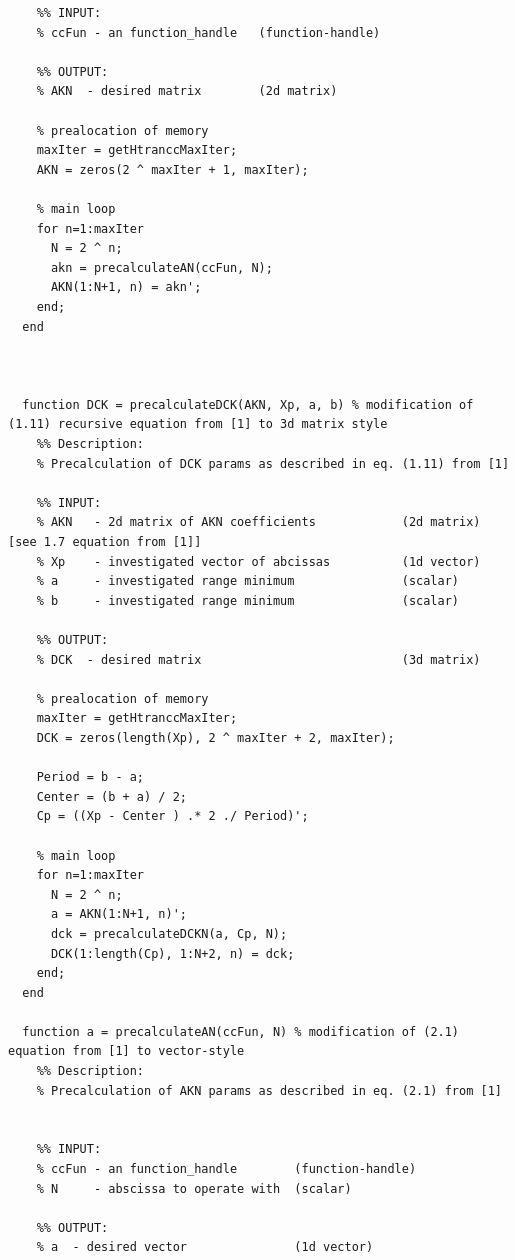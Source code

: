 \documentclass[12pt,twoside,a4paper]{article}
\numberwithin{equation}{subsection}
\numberwithin{figure}{subsection}
\begin{document}
\begin{lstlisting}
    %% INPUT:
    % ccFun - an function_handle   (function-handle) 

    %% OUTPUT:
    % AKN  - desired matrix        (2d matrix)

    % prealocation of memory
    maxIter = getHtranccMaxIter;
    AKN = zeros(2 ^ maxIter + 1, maxIter);

    % main loop
    for n=1:maxIter
      N = 2 ^ n;
      akn = precalculateAN(ccFun, N);
      AKN(1:N+1, n) = akn';
    end;
  end



  function DCK = precalculateDCK(AKN, Xp, a, b) % modification of (1.11) recursive equation from [1] to 3d matrix style
    %% Description:
    % Precalculation of DCK params as described in eq. (1.11) from [1] 

    %% INPUT:
    % AKN   - 2d matrix of AKN coefficients            (2d matrix) [see 1.7 equation from [1]]
    % Xp    - investigated vector of abcissas          (1d vector)
    % a     - investigated range minimum               (scalar)
    % b     - investigated range minimum               (scalar)

    %% OUTPUT:
    % DCK  - desired matrix                            (3d matrix)

    % prealocation of memory
    maxIter = getHtranccMaxIter;
    DCK = zeros(length(Xp), 2 ^ maxIter + 2, maxIter);

    Period = b - a;
    Center = (b + a) / 2;
    Cp = ((Xp - Center ) .* 2 ./ Period)';

    % main loop
    for n=1:maxIter
      N = 2 ^ n;
      a = AKN(1:N+1, n)';
      dck = precalculateDCKN(a, Cp, N);
      DCK(1:length(Cp), 1:N+2, n) = dck;
    end;
  end

  function a = precalculateAN(ccFun, N) % modification of (2.1) equation from [1] to vector-style
    %% Description:
    % Precalculation of AKN params as described in eq. (2.1) from [1]


    %% INPUT:
    % ccFun - an function_handle        (function-handle) 
    % N     - abscissa to operate with  (scalar)

    %% OUTPUT:
    % a  - desired vector               (1d vector)


\end{lstlisting}
\end{document}
